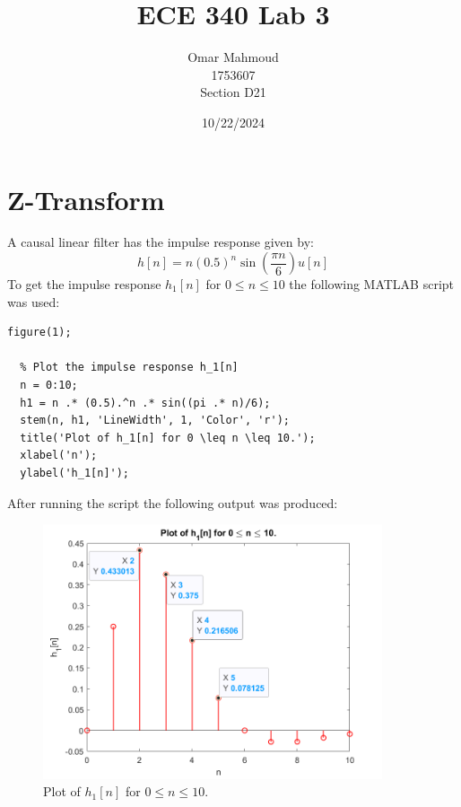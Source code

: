 \documentclass[a4paper, 10pt]{article}
\title{ECE 340 Lab 3}
\author{Omar Mahmoud\\1753607\\Section D21}
\date{10/22/2024}
\begin{document}
\thispagestyle{empty}
\vfill
\maketitle
\vfill

\newpage

\section{Z-Transform}
A causal linear filter has the impulse response given by:
\begin{equation}
  h[n] = n(0.5)^n\sin(\frac{\pi n}{6})u[n]
\end{equation}
To get the impulse response $h_1[n]$ for $0\leq n\leq 10$ the following MATLAB script was used:
\begin{lstlisting}[style=Matlab-editor, basicstyle=\small\ttfamily]
  figure(1);

  % Plot the impulse response h_1[n]
  n = 0:10;
  h1 = n .* (0.5).^n .* sin((pi .* n)/6);
  stem(n, h1, 'LineWidth', 1, 'Color', 'r');
  title('Plot of h_1[n] for 0 \leq n \leq 10.');
  xlabel('n');
  ylabel('h_1[n]');
\end{lstlisting}
After running the script the following output was produced:
\begin{figure}[H]
  \centering
  \includegraphics[width=10cm]{images/q1_a.png}
  \caption{Plot of $h_1[n]$ for $0\leq n\leq 10$.}
\end{figure}

\hfill
\end{document}

